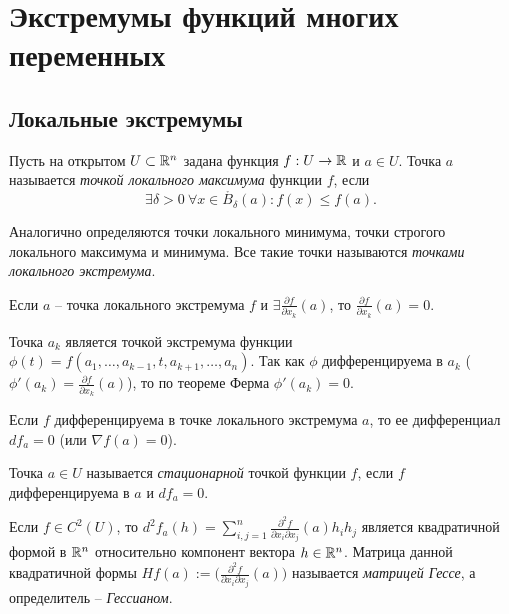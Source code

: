 \section{Экстремумы функций многих переменных}

\subsection{Локальные экстремумы}

\begin{definition}
	Пусть на открытом $U \subset \mathbb{R}^n$ задана функция $f : U \to \mathbb{R}$ и $a \in U$. 
	Точка $a$ называется \textit{точкой локального максимума} функции $f$, если 
	\[ \exists \delta > 0 \ \forall x \in \mathring{B_{\delta}}(a) : f(x) \leq f(a). \]
\end{definition}

\vspace{5pt}
Аналогично определяются точки локального минимума, точки строгого локального максимума и минимума. 
Все такие точки называются \textit{точками локального экстремума}. 

\begin{theorem}
	Если $a$ -- точка локального экстремума $f$ и $\exists \frac{\partial f}{\partial x_k}(a)$, то $\frac{\partial f}{\partial x_k}(a) = 0$.
\end{theorem}

\begin{myproof}
	Точка $a_k$ является точкой экстремума функции $\phi(t) = f(a_1, \dotsc, a_{k-1}, t, a_{k+1}, \dotsc, a_n)$.
	Так как $\phi$ дифференцируема в $a_k$ ($\phi'(a_k) = \frac{\partial f}{\partial x_k}(a)$), то по теореме Ферма $\phi'(a_k) = 0$.
\end{myproof}

\begin{corollary}
	Если $f$ дифференцируема в точке локального экстремума $a$, то ее дифференциал $df_a = 0$ (или $\nabla f(a) = 0$).
\end{corollary}

\begin{definition}
	Точка $a \in U$ называется \textit{стационарной} точкой функции $f$, если $f$ дифференцируема в $a$ и $df_a = 0$.
\end{definition}

\begin{reminder}
	Если $f \in C^2(U)$, то $d^2 f_a(h) = \sum \limits_{i, j = 1}^{n} \frac{\partial^2 f}{\partial x_i \partial x_j}(a) h_i h_j$ является квадратичной формой в $\mathbb{R}^n$ относительно компонент вектора $h \in \mathbb{R}^n$.
	Матрица данной квадратичной формы $H f(a) := \big( \frac{\partial^2 f}{\partial x_i \partial x_j}(a) \big)$ называется \textit{матрицей Гессе}, а определитель -- \textit{Гессианом}.
\end{reminder}

